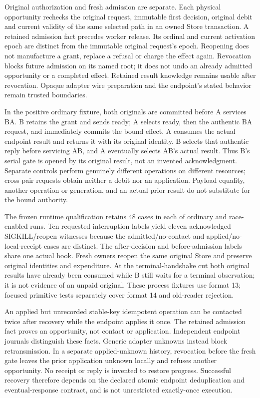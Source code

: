 \documentclass[11pt,a4paper]{article}
\theoremstyle{definition}
\theoremstyle{remark}
\begin{document}
Original authorization and fresh admission are separate. Each physical opportunity rechecks the original request, immutable first decision, original debit and current validity of the same selected path in an owned Store transaction. A retained admission fact precedes worker release. Its ordinal and current activation epoch are distinct from the immutable original request's epoch. Reopening does not manufacture a grant, replace a refusal or charge the effect again. Revocation blocks future admission on its named root; it does not undo an already admitted opportunity or a completed effect. Retained result knowledge remains usable after revocation. Opaque adapter wire preparation and the endpoint's stated behavior remain trusted boundaries.

In the positive ordinary fixture, both originals are committed before A services BA. B retains the grant and sends ready; A selects ready, then the authentic BA request, and immediately commits the bound effect. A consumes the actual endpoint result and returns it with its original identity. B selects that authentic reply before servicing AB, and A eventually selects AB's actual result. Thus B's serial gate is opened by its original result, not an invented acknowledgment. Separate controls perform genuinely different operations on different resources; cross-pair requests obtain neither a debit nor an application. Payload equality, another operation or generation, and an actual prior result do not substitute for the bound authority.

The frozen runtime qualification retains 48 cases in each of ordinary and race-enabled runs. Ten requested interruption labels yield eleven acknowledged SIGKILL/reopen witnesses because the admitted/no-contact and applied/no-local-receipt cases are distinct. The after-decision and before-admission labels share one actual hook. Fresh owners reopen the same original Store and preserve original identities and expenditure. At the terminal-handshake cut both original results have already been consumed while B still waits for a terminal observation; it is not evidence of an unpaid original. These process fixtures use format 13; focused primitive tests separately cover format 14 and old-reader rejection.

An applied but unrecorded stable-key idempotent operation can be contacted twice after recovery while the endpoint applies it once. The retained admission fact proves an opportunity, not contact or application. Independent endpoint journals distinguish these facts. Generic adapter unknowns instead block retransmission. In a separate applied-unknown history, revocation before the fresh gate leaves the prior application unknown locally and refuses another opportunity. No receipt or reply is invented to restore progress. Successful recovery therefore depends on the declared atomic endpoint deduplication and eventual-response contract, and is not unrestricted exactly-once execution.
\end{document}
